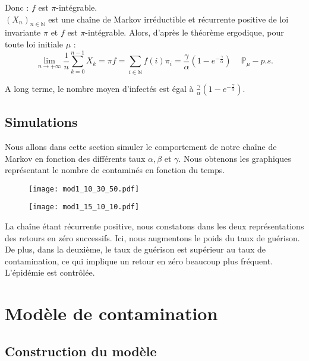 \documentclass[12pt,a4paper]{report}
\theoremstyle{remark}
\begin{document}
Donc : $f$ est $\pi$-intégrable.\\

$(X_n)_{n \in \mathbb{N}}$ est une chaîne de Markov irréductible et récurrente positive de loi invariante $\pi$ et $f$ est $\pi$-intégrable. Alors, d’après le théorème ergodique, pour toute loi initiale $\mu$ :
$$\lim\limits_{n \to +\infty} \frac{1}{n} \sum\limits_{k=0}^{n-1} X_k= \pi f = \sum\limits_{i\in\mathbb{N}} f(i)\pi_i=  \frac{\gamma}{\alpha} \left(1 - e^{-\frac{\gamma}{\alpha}}\right) \text{   }\, \, \, \mathbb{P}_{\mu}-p.s.$$

A long terme, le nombre moyen d'infectés est égal à $ \frac{\gamma}{\alpha} \left(1 - e^{-\frac{\gamma}{\alpha}}\right)$.

\subsection{Simulations}

Nous allons dans cette section simuler le comportement de notre chaîne de Markov en fonction des différents taux $\alpha, \beta$ et $ \gamma$. Nous obtenons les graphiques représentant le nombre de contaminés en fonction du temps.

\begin{figure}[h]
    \begin{minipage}[c]{0.25\linewidth}
        \centering
        \texttt{[image: mod1\_10\_30\_50.pdf]}
    \end{minipage}
    \hfill%
    \vspace{0.1cm}
    \begin{minipage}[c]{0.50\linewidth}
        \centering
       \texttt{[image: mod1\_15\_10\_10.pdf]}
    \end{minipage}
\end{figure}  

La chaîne étant récurrente positive, nous constatons dans les deux représentations des retours en zéro successifs. Ici, nous augmentons le poids du taux de guérison. De plus, dans  la deuxième, le taux de guérison est supérieur au taux de contamination, ce qui implique un retour en zéro beaucoup plus fréquent. L'épidémie est contrôlée.

\section{Modèle de contamination}

\subsection{Construction du modèle}
\vspace{0.6cm}
\end{document}
